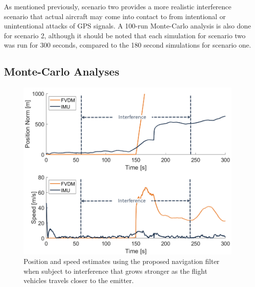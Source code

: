 As mentioned previously, scenario two provides a more realistic interference scenario that actual aircraft may come into contact to from intentional or unintentional attacks of GPS signals. A 100-run Monte-Carlo analysis is also done for scenario 2, although it should be noted that each simulation for scenario two was run for 300 seconds, compared to the 180 second simulations for scenario one. 

\subsection{\textbf{Monte-Carlo Analyses}}

\begin{figure}[!ht]
    \centering
    \includegraphics[width=0.75\linewidth]{Figures/Results/trajectoryfigure/Slide19.PNG}
    \caption{Position and speed estimates using the proposed navigation filter when subject to interference that grows stronger as the flight vehicles travels closer to the emitter.}\label{fig:PosVelScene2}
\end{figure}


